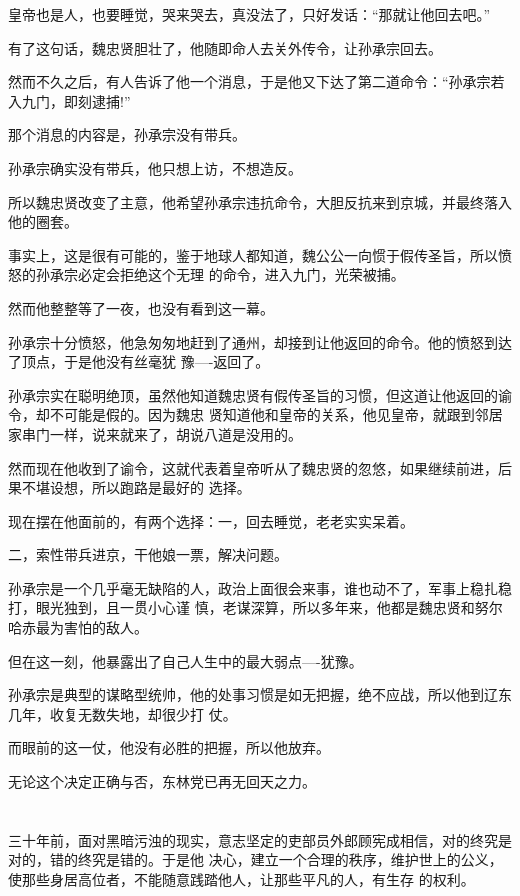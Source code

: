 \documentclass[11pt,a4paper,onecolumn]{article}
\begin{document}
皇帝也是人，也要睡觉，哭来哭去，真没法了，只好发话：``那就让他回去吧。''

有了这句话，魏忠贤胆壮了，他随即命人去关外传令，让孙承宗回去。

然而不久之后，有人告诉了他一个消息，于是他又下达了第二道命令：``孙承宗若入九门，即刻逮捕!''

那个消息的内容是，孙承宗没有带兵。

孙承宗确实没有带兵，他只想上访，不想造反。

所以魏忠贤改变了主意，他希望孙承宗违抗命令，大胆反抗来到京城，并最终落入他的圈套。

事实上，这是很有可能的，鉴于地球人都知道，魏公公一向惯于假传圣旨，所以愤怒的孙承宗必定会拒绝这个无理
的命令，进入九门，光荣被捕。

然而他整整等了一夜，也没有看到这一幕。

孙承宗十分愤怒，他急匆匆地赶到了通州，却接到让他返回的命令。他的愤怒到达了顶点，于是他没有丝毫犹
豫----返回了。

孙承宗实在聪明绝顶，虽然他知道魏忠贤有假传圣旨的习惯，但这道让他返回的谕令，却不可能是假的。因为魏忠
贤知道他和皇帝的关系，他见皇帝，就跟到邻居家串门一样，说来就来了，胡说八道是没用的。

然而现在他收到了谕令，这就代表着皇帝听从了魏忠贤的忽悠，如果继续前进，后果不堪设想，所以跑路是最好的
选择。

现在摆在他面前的，有两个选择：一，回去睡觉，老老实实呆着。

二，索性带兵进京，干他娘一票，解决问题。

孙承宗是一个几乎毫无缺陷的人，政治上面很会来事，谁也动不了，军事上稳扎稳打，眼光独到，且一贯小心谨
慎，老谋深算，所以多年来，他都是魏忠贤和努尔哈赤最为害怕的敌人。

但在这一刻，他暴露出了自己人生中的最大弱点----犹豫。

孙承宗是典型的谋略型统帅，他的处事习惯是如无把握，绝不应战，所以他到辽东几年，收复无数失地，却很少打
仗。

而眼前的这一仗，他没有必胜的把握，所以他放弃。

无论这个决定正确与否，东林党已再无回天之力。

\section[\thesection]{}

三十年前，面对黑暗污浊的现实，意志坚定的吏部员外郎顾宪成相信，对的终究是对的，错的终究是错的。于是他
决心，建立一个合理的秩序，维护世上的公义，使那些身居高位者，不能随意践踏他人，让那些平凡的人，有生存
的权利。
\end{document}
